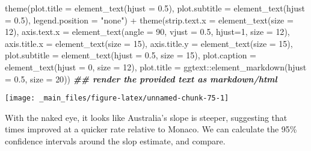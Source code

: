 \documentclass[
]{book}
\newenvironment{Shaded}{\begin{snugshade}}{\end{snugshade}}
\newcommand{\AttributeTok}[1]{\textcolor[rgb]{0.77,0.63,0.00}{#1}}
\newcommand{\DecValTok}[1]{\textcolor[rgb]{0.00,0.00,0.81}{#1}}
\newcommand{\DocumentationTok}[1]{\textcolor[rgb]{0.56,0.35,0.01}{\textbf{\textit{#1}}}}
\newcommand{\FloatTok}[1]{\textcolor[rgb]{0.00,0.00,0.81}{#1}}
\newcommand{\FunctionTok}[1]{\textcolor[rgb]{0.00,0.00,0.00}{#1}}
\newcommand{\NormalTok}[1]{#1}
\newcommand{\SpecialCharTok}[1]{\textcolor[rgb]{0.00,0.00,0.00}{#1}}
\newcommand{\StringTok}[1]{\textcolor[rgb]{0.31,0.60,0.02}{#1}}
\begin{document}
\begin{Shaded}
\begin{Highlighting}[]
  \FunctionTok{theme}\NormalTok{(}\AttributeTok{plot.title =} \FunctionTok{element\_text}\NormalTok{(}\AttributeTok{hjust =} \FloatTok{0.5}\NormalTok{),}
        \AttributeTok{plot.subtitle =} \FunctionTok{element\_text}\NormalTok{(}\AttributeTok{hjust =} \FloatTok{0.5}\NormalTok{),}
        \AttributeTok{legend.position =} \StringTok{"none"}\NormalTok{)  }\SpecialCharTok{+}
  \FunctionTok{theme}\NormalTok{(}\AttributeTok{strip.text.x =} \FunctionTok{element\_text}\NormalTok{(}\AttributeTok{size =} \DecValTok{12}\NormalTok{),}
        \AttributeTok{axis.text.x =} \FunctionTok{element\_text}\NormalTok{(}\AttributeTok{angle =} \DecValTok{90}\NormalTok{, }\AttributeTok{vjust =} \FloatTok{0.5}\NormalTok{, }\AttributeTok{hjust=}\DecValTok{1}\NormalTok{, }\AttributeTok{size =} \DecValTok{12}\NormalTok{),}
        \AttributeTok{axis.title.x =} \FunctionTok{element\_text}\NormalTok{(}\AttributeTok{size =} \DecValTok{15}\NormalTok{),}
        \AttributeTok{axis.title.y =} \FunctionTok{element\_text}\NormalTok{(}\AttributeTok{size =} \DecValTok{15}\NormalTok{),}
         \AttributeTok{plot.subtitle =} \FunctionTok{element\_text}\NormalTok{(}\AttributeTok{hjust =} \FloatTok{0.5}\NormalTok{, }\AttributeTok{size =} \DecValTok{15}\NormalTok{),}
         \AttributeTok{plot.caption =} \FunctionTok{element\_text}\NormalTok{(}\AttributeTok{hjust =} \DecValTok{0}\NormalTok{, }\AttributeTok{size =} \DecValTok{12}\NormalTok{),}
        \AttributeTok{plot.title =}\NormalTok{ ggtext}\SpecialCharTok{::}\FunctionTok{element\_markdown}\NormalTok{(}\AttributeTok{hjust =} \FloatTok{0.5}\NormalTok{, }\AttributeTok{size =} \DecValTok{20}\NormalTok{)) }\DocumentationTok{\#\# render the provided text as markdown/html}
\end{Highlighting}
\end{Shaded}

\begin{center}\texttt{[image: \_main\_files/figure-latex/unnamed-chunk-75-1]} \end{center}

With the naked eye, it looks like Australia's slope is steeper, suggesting that times improved at a quicker rate relative to Monaco. We can calculate the 95\% confidence intervals around the slop estimate, and compare.
\end{document}
